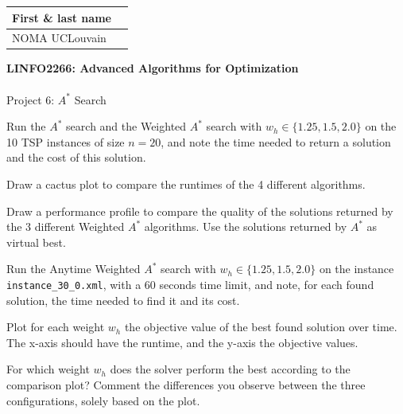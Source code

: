 \documentclass[12pt]{report}
\newcommand{\answerbox}[2]{\hfill\break\\
        \framebox[\linewidth]{\parbox[c][#1][c]{\dimexpr\linewidth-2\fboxsep-2\fboxrule}{#2}}
}
\begin{document}
\hfill
\begingroup
\Large
\begin{tabular}{|l|p{6cm}|}
	\hline
	First \& last name &
	\\ \hline
	NOMA UCLouvain & 
	\\ \hline
\end{tabular}
\endgroup
\vspace{1.5cm}

\noindent
\begingroup
	\Large
	\textbf{LINFO2266: Advanced Algorithms for Optimization}\\\\
	Project 6: $A^*$ Search
\endgroup
\vspace{0.2cm}

\begin{Exercise}[title={Experimental comparison of $A^*$ and Weighted $A^*$}]

    Run the $A^*$ search and the Weighted $A^*$ search with $w_h \in \{1.25, 1.5, 2.0\}$ on the 10 TSP instances of size $n=20$, and note the time needed to return a solution and the cost of this solution.

    \Question 
    Draw a cactus plot to compare the runtimes of the 4 different algorithms.
    \answerbox{9cm}{
    }
\pagebreak
    \Question 
    Draw a performance profile to compare the quality of the solutions returned by the 3 different Weighted $A^*$ algorithms. Use the solutions returned by $A^*$ as virtual best.
    \answerbox{9cm}{
    }
\end{Exercise}
\pagebreak

\begin{Exercise}[title={Experimental evaluation of Anytime Weighted $A^*$}]

    Run the Anytime Weighted $A^*$ search with $w_h \in \{1.25, 1.5, 2.0\}$ on the instance \verb|instance_30_0.xml|, with a 60 seconds time limit, and note, for each found solution, the time needed to find it and its cost.

    \Question 
    Plot for each weight $w_h$ the objective value of the best found solution over time.
    The x-axis should have the runtime, and the y-axis the objective values.
    \answerbox{12cm}{
    }

    \Question For which weight $w_h$ does the solver perform the best according to the comparison plot? Comment the differences you observe between the three configurations, solely based on the plot.
		\answerbox{2.5cm}{
		}




    
\end{Exercise}
\end{document}

